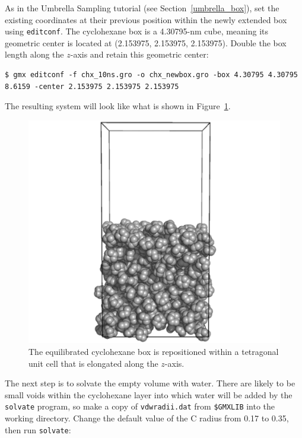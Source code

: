\documentclass[9pt,tutorial,pubversion]{livecoms}
\begin{document}
As in the Umbrella Sampling tutorial (see Section~\ref{umbrella_box}), set the existing coordinates at their previous position within the newly extended box using \texttt{editconf}. The cyclohexane box is a 4.30795-nm cube, meaning its geometric center is located at (2.153975, 2.153975, 2.153975). Double the box length along the $z$-axis and retain this geometric center:

\begin{lstlisting}
$ gmx editconf -f chx_10ns.gro -o chx_newbox.gro -box 4.30795 4.30795 8.6159 -center 2.153975 2.153975 2.153975
\end{lstlisting}
%
The resulting system will look like what is shown in Figure~\ref{biphasic_system_newbox_fig}.

\begin{figure}[h!]
\centering
\includegraphics{biphasic_system_newbox}
\caption{The equilibrated cyclohexane box is repositioned within a tetragonal unit cell that is elongated along the $z$-axis.}
\label{biphasic_system_newbox_fig}
\end{figure}

The next step is to solvate the empty volume with water. There are likely to be small voids within the cyclohexane layer into which water will be added by the \texttt{solvate} program, so make a copy of \texttt{vdwradii.dat} from \texttt{\$GMXLIB} into the working directory. Change the default value of the C radius from 0.17 to 0.35, then run \texttt{solvate}:
\end{document}
